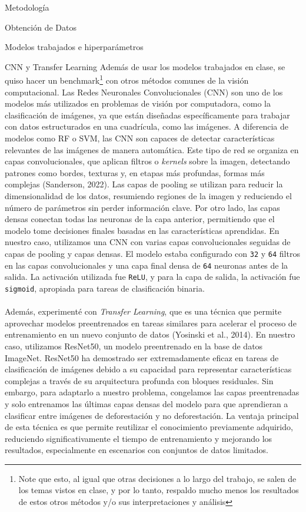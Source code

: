 \documentclass[11pt]{article}
\begin{document}
\begin{section}{Metodología}
\begin{subsection}{Obtención de Datos}
\begin{subsection}{Modelos trabajados e hiperparámetros}
\begin{subsubsection}{CNN y Transfer Learning}
Además de usar los modelos trabajados en clase, se quiso hacer un benchmark\footnote{Note que esto, al igual que otras decisiones a lo largo del trabajo, se salen de los temas vistos en clase, y por lo tanto, respaldo mucho menos los resultados de estos otros métodos y/o sus interpretaciones y análisis} con otros métodos comunes de la visión computacional. Las Redes Neuronales Convolucionales (CNN) son uno de los modelos más utilizados en problemas de visión por computadora, como la clasificación de imágenes, ya que están diseñadas específicamente para trabajar con datos estructurados en una cuadrícula, como las imágenes. A diferencia de modelos como RF o SVM, las CNN son capaces de detectar características relevantes de las imágenes de manera automática. Este tipo de red se organiza en capas convolucionales, que aplican filtros o \textit{kernels} sobre la imagen, detectando patrones como bordes, texturas y, en etapas más profundas, formas más complejas (Sanderson, 2022). Las capas de pooling se utilizan para reducir la dimensionalidad de los datos, resumiendo regiones de la imagen y reduciendo el número de parámetros sin perder información clave. Por otro lado, las capas densas conectan todas las neuronas de la capa anterior, permitiendo que el modelo tome decisiones finales basadas en las características aprendidas. En nuestro caso, utilizamos una CNN con varias capas convolucionales seguidas de capas de pooling y capas densas. El modelo estaba configurado con \texttt{32} y \texttt{64} filtros en las capas convolucionales y una capa final densa de \texttt{64} neuronas antes de la salida. La activación utilizada fue \texttt{ReLU}, y para la capa de salida, la activación fue \texttt{sigmoid}, apropiada para tareas de clasificación binaria.
\\
\\
Además, experimenté con \textit{Transfer Learning}, que es una técnica que permite aprovechar modelos preentrenados en tareas similares para acelerar el proceso de entrenamiento en un nuevo conjunto de datos (Yosinski et al., 2014). En nuestro caso, utilizamos ResNet50, un modelo preentrenado en la base de datos ImageNet. ResNet50 ha demostrado ser extremadamente eficaz en tareas de clasificación de imágenes debido a su capacidad para representar características complejas a través de su arquitectura profunda con bloques residuales. Sin embargo, para adaptarlo a nuestro problema, congelamos las capas preentrenadas y solo entrenamos las últimas capas densas del modelo para que aprendieran a clasificar entre imágenes de deforestación y no deforestación. La ventaja principal de esta técnica es que permite reutilizar el conocimiento previamente adquirido, reduciendo significativamente el tiempo de entrenamiento y mejorando los resultados, especialmente en escenarios con conjuntos de datos limitados.


\end{subsubsection}
\end{subsection}
\end{subsection}
\end{section}
\end{document}
